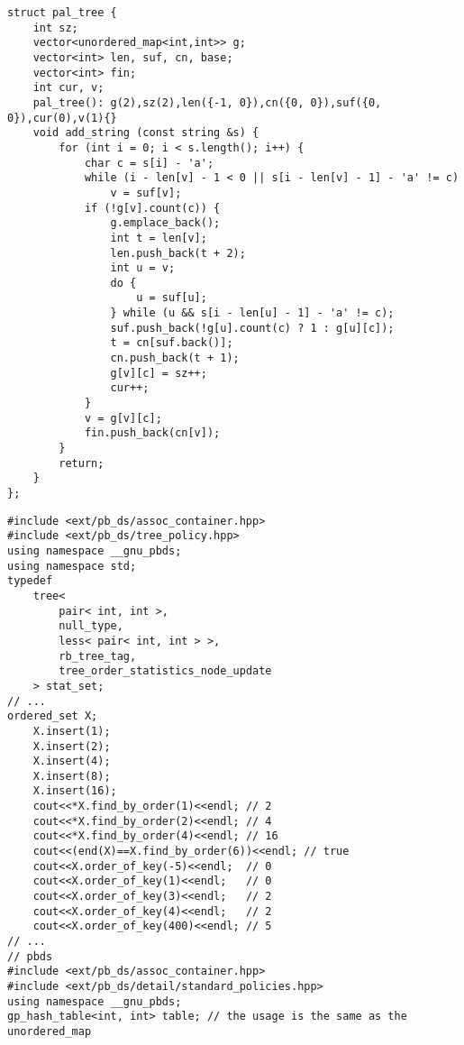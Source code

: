 \documentclass[12pt]{article}
\begin{document}
\begin{verbatim}
struct pal_tree {
    int sz;
    vector<unordered_map<int,int>> g;
    vector<int> len, suf, cn, base;
    vector<int> fin;
    int cur, v;
    pal_tree(): g(2),sz(2),len({-1, 0}),cn({0, 0}),suf({0, 0}),cur(0),v(1){}
    void add_string (const string &s) {
        for (int i = 0; i < s.length(); i++) {
            char c = s[i] - 'a';
            while (i - len[v] - 1 < 0 || s[i - len[v] - 1] - 'a' != c)
                v = suf[v];
            if (!g[v].count(c)) {
                g.emplace_back();
                int t = len[v];
                len.push_back(t + 2);
                int u = v;
                do {
                    u = suf[u];
                } while (u && s[i - len[u] - 1] - 'a' != c);
                suf.push_back(!g[u].count(c) ? 1 : g[u][c]);
                t = cn[suf.back()];
                cn.push_back(t + 1);
                g[v][c] = sz++;
                cur++;
            }
            v = g[v][c];
            fin.push_back(cn[v]);
        }
        return;
    }
};
\end{verbatim}

\begin{verbatim}
#include <ext/pb_ds/assoc_container.hpp>
#include <ext/pb_ds/tree_policy.hpp>
using namespace __gnu_pbds;
using namespace std;
typedef
    tree<
        pair< int, int >,
        null_type,
        less< pair< int, int > >,
        rb_tree_tag,
        tree_order_statistics_node_update
    > stat_set;
// ...
ordered_set X;
    X.insert(1);
    X.insert(2);
    X.insert(4);
    X.insert(8);
    X.insert(16);
    cout<<*X.find_by_order(1)<<endl; // 2
    cout<<*X.find_by_order(2)<<endl; // 4
    cout<<*X.find_by_order(4)<<endl; // 16
    cout<<(end(X)==X.find_by_order(6))<<endl; // true
    cout<<X.order_of_key(-5)<<endl;  // 0
    cout<<X.order_of_key(1)<<endl;   // 0
    cout<<X.order_of_key(3)<<endl;   // 2
    cout<<X.order_of_key(4)<<endl;   // 2
    cout<<X.order_of_key(400)<<endl; // 5
// ...
// pbds
#include <ext/pb_ds/assoc_container.hpp>
#include <ext/pb_ds/detail/standard_policies.hpp>
using namespace __gnu_pbds;
gp_hash_table<int, int> table; // the usage is the same as the unordered_map
\end{verbatim}
\end{document}
